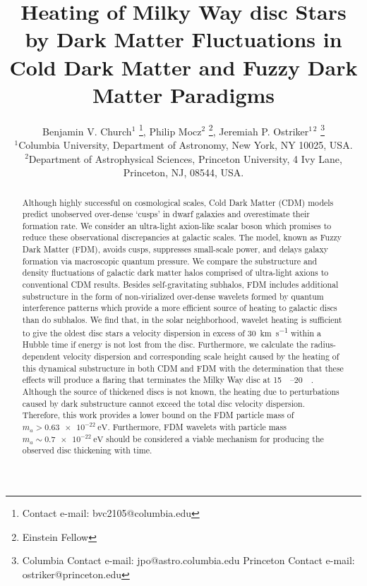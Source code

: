 \documentclass[usenatbib]{mnras}
\newcommand{\squote}[1]{\lq #1\rq}
\begin{document}
\title[Dark Matter Heating]{Heating of Milky Way disc Stars by Dark Matter Fluctuations in Cold Dark Matter and Fuzzy Dark Matter Paradigms}
\author[B. V. Church et al.]{
Benjamin V. Church$^{1}$ \thanks{Contact e-mail: bvc2105@columbia.edu}, Philip Mocz$^{2}$ \thanks{Einstein Fellow},
Jeremiah P. Ostriker$^{1 \, 2}$ \thanks{Columbia Contact e-mail: jpo@astro.columbia.edu 
\newline
Princeton Contact e-mail: ostriker@princeton.edu} 
\\
$^{1}$Columbia University, Department of Astronomy, New York, NY 10025, USA.
\\
$^{2}$Department of Astrophysical Sciences, Princeton University, 4 Ivy Lane, Princeton, NJ, 08544, USA.}
\maketitle
\begin{abstract}
Although highly successful on cosmological scales, Cold Dark Matter (CDM) models predict unobserved over-dense \squote{cusps} in dwarf galaxies and overestimate their formation rate. We consider an ultra-light axion-like scalar boson which promises to reduce these observational discrepancies at galactic scales. The model, known as Fuzzy Dark Matter (FDM), avoids cusps, suppresses small-scale power, and delays galaxy formation via macroscopic quantum pressure. We compare the { \color{magenta} substructure and density fluctuations } of galactic dark matter halos comprised of ultra-light axions to conventional CDM results. Besides self-gravitating subhalos, FDM includes additional substructure in the form of non-virialized over-dense wavelets formed by quantum interference patterns which provide a more efficient source of heating to galactic discs than do subhalos. We find that, in the solar neighborhood, wavelet heating is sufficient to give the oldest disc stars a velocity dispersion in excess of \SI{30}{\kilo\meter\per\second} within a Hubble time if energy is not lost from the disc. 
Furthermore, we calculate the radius-dependent velocity dispersion and corresponding scale height caused by the heating of {\color{magenta} this dynamical substructure } in both CDM and FDM with the determination that these effects will produce a flaring that terminates the Milky Way disc at \SIrange{15}{20}{\kilo \parsec}. Although the source of thickened discs is not known, the heating due to perturbations caused by dark substructure cannot exceed the total disc velocity dispersion. Therefore, this work provides a lower bound on the FDM particle mass of $m_a > \SI{0.63 e-22}{\electronvolt}$. Furthermore, FDM wavelets with particle mass $m_a \sim \SI{0.7e-22}{\electronvolt}$ should be considered a viable mechanism for producing the observed disc thickening with time.
\end{abstract}
\end{document}
